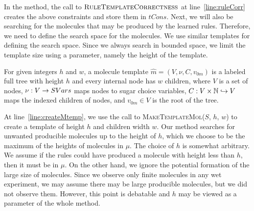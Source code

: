 In the method, the call to $\textsc{RuleTemplateCorrectness}$ at
line~\ref{line:ruleCorr} creates the above constraints
and store them in $tCons$.
Next, we will also be searching for the molecules that may be produced by the learned rules.
Therefore, we need to define the search space for the molecules.
We use similar templates for defining the search space.
Since we always search in bounded space, we limit the template size using a parameter,
namely the height of the template.
\begin{df}
For given integers $h$ and $w$,
a {molecule template} $\hat{m} = (V, \nu, C, v_{0m})$ is a labeled full tree with height $h$ and 
every internal node has $w$ children, where 
$V$ is a set of nodes, $\nu : V \rightarrow SVars$ maps nodes to sugar choice variables,
$C : V \times \mathbb{N} \hookrightarrow V$ maps the indexed children of nodes,
and
$v_{0m} \in V$ is the root of the tree.
\end{df}
At line~\ref{line:createMtemp}, we use the call to \textsc{MakeTemplateMol}($S$, $h$, $w$) to
create a template of height $h$ and children width $w$.
%
Our method searches for unwanted producible molecules up to the height of $h$,
which we choose to be the maximum of the heights of molecules in $\mu$.
%
The choice of $h$ is somewhat arbitrary.
%
We assume if the rules could have produced a molecule with height less than $h$,
then it must be in $\mu$.
On the other hand, we ignore the potential formation of the large size of molecules.
%
Since we observe only finite molecules in any wet experiment, we may assume
there may be large producible molecules, but we did not observe them.
However, this point is debatable and $h$ may be viewed as a parameter of the whole
method.

